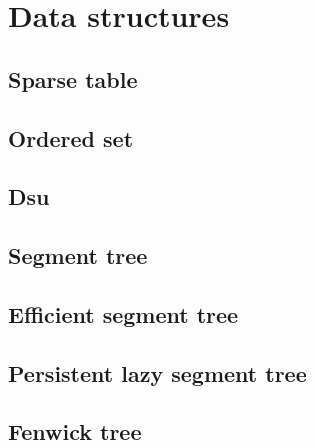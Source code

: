 \section{Data structures}

\subsection{Sparse table}

\subsection{Ordered set}

\subsection{Dsu}

\subsection{Segment tree}

\subsection{Efficient segment tree}

\subsection{Persistent lazy segment tree}

\subsection{Fenwick tree}
